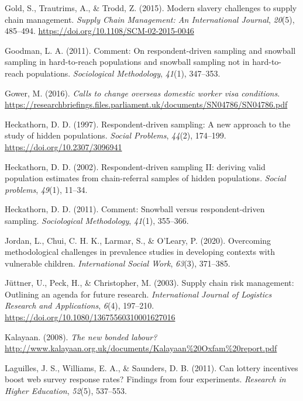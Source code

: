\documentclass[
  12pt,
]{article}
\newlength{\cslhangindent}
\newenvironment{CSLReferences}[2] %
 {\begin{list}{}{%
  \setlength{\itemindent}{0pt}
  \setlength{\leftmargin}{0pt}
  \setlength{\parsep}{0pt}
  \ifodd #1
   \setlength{\leftmargin}{\cslhangindent}
   \setlength{\itemindent}{-1\cslhangindent}
  \fi
  \setlength{\itemsep}{#2\baselineskip}}}
 {\end{list}}
\theoremstyle{plain}
\theoremstyle{definition}
\begin{document}
\begin{CSLReferences}{1}{0}
Gold, S., Trautrims, A., \& Trodd, Z. (2015). Modern slavery challenges
to supply chain management. \emph{Supply Chain Management: An
International Journal}, \emph{20}(5), 485--494.
\url{https://doi.org/10.1108/SCM-02-2015-0046}

Goodman, L. A. (2011). Comment: On respondent-driven sampling and
snowball sampling in hard-to-reach populations and snowball sampling not
in hard-to-reach populations. \emph{Sociological Methodology},
\emph{41}(1), 347--353.

Gower, M. (2016). \emph{Calls to change overseas domestic worker visa
conditions}.
\url{https://researchbriefings.files.parliament.uk/documents/SN04786/SN04786.pdf}

Heckathorn, D. D. (1997). Respondent-driven sampling: A new approach to
the study of hidden populations. \emph{Social Problems}, \emph{44}(2),
174--199. \url{https://doi.org/10.2307/3096941}

Heckathorn, D. D. (2002). Respondent-driven sampling {II}: deriving
valid population estimates from chain-referral samples of hidden
populations. \emph{Social problems}, \emph{49}(1), 11--34.

Heckathorn, D. D. (2011). Comment: Snowball versus respondent-driven
sampling. \emph{Sociological Methodology}, \emph{41}(1), 355--366.

Jordan, L., Chui, C. H. K., Larmar, S., \& O'Leary, P. (2020).
Overcoming methodological challenges in prevalence studies in developing
contexts with vulnerable children. \emph{International Social Work},
\emph{63}(3), 371--385.

Jüttner, U., Peck, H., \& Christopher, M. (2003). Supply chain risk
management: Outlining an agenda for future research. \emph{International
Journal of Logistics Research and Applications}, \emph{6}(4), 197--210.
\url{https://doi.org/10.1080/13675560310001627016}

Kalayaan. (2008). \emph{The new bonded labour?}
\url{http://www.kalayaan.org.uk/documents/Kalayaan\%20Oxfam\%20report.pdf}

Laguilles, J. S., Williams, E. A., \& Saunders, D. B. (2011). Can
lottery incentives boost web survey response rates? Findings from four
experiments. \emph{Research in Higher Education}, \emph{52}(5),
537--553.


\end{CSLReferences}
\end{document}
